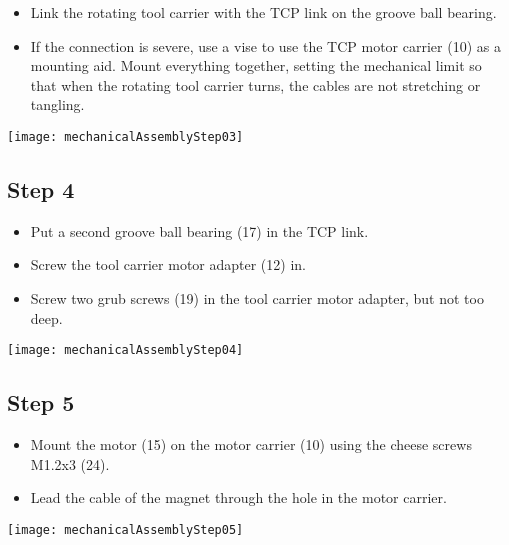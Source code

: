 \begin{minipage}[t]{0.6\textwidth}
	\begin{itemize}
		\item Link the rotating tool carrier with the TCP link on the groove ball bearing.
		\item If the connection is severe, use a vise to use the TCP motor carrier (10) as a mounting aid. Mount everything together, setting the mechanical limit so that when the rotating tool carrier turns, the cables are not stretching or tangling.
	\end{itemize}
\end{minipage}
\hfill
\begin{minipage}[t]{0.35\textwidth}
	\vspace{-\ht\strutbox}\texttt{[image: mechanicalAssemblyStep03]}
	\label{fig:MechanicalAssebmlyStep03} 
\end{minipage}

\subsection*{Step 4}

\begin{minipage}[t]{0.6\textwidth}
	\begin{itemize}
		\item Put a second groove ball bearing (17) in the TCP link.
		\item Screw the tool carrier motor adapter (12) in.
		\item Screw two grub screws (19) in the tool carrier motor adapter, but not too deep.
	\end{itemize}
\end{minipage}
\hfill
\begin{minipage}[t]{0.35\textwidth}
	\vspace{-\ht\strutbox}\texttt{[image: mechanicalAssemblyStep04]}
	\label{fig:MechanicalAssebmlyStep04} 
\end{minipage}

\subsection*{Step 5}

\begin{minipage}[t]{0.6\textwidth}
	\begin{itemize}
		\item Mount the motor (15) on the motor carrier (10) using the cheese screws M1.2x3 (24).
		\item Lead the cable of the magnet through the hole in the motor carrier.
	\end{itemize}
\end{minipage}
\hfill
\begin{minipage}[t]{0.35\textwidth}
	\vspace{-\ht\strutbox}\texttt{[image: mechanicalAssemblyStep05]}
	\label{fig:MechanicalAssebmlyStep05} 
\end{minipage}

